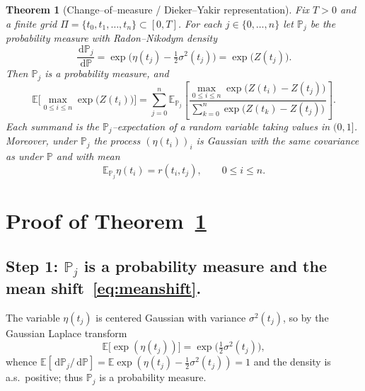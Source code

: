 \documentclass{amsart}
\newtheorem{theorem}{Theorem}
\theoremstyle{definition}
\newcommand{\E}{\mathbb{E}}
\newcommand{\PP}{\mathbb{P}}
\newcommand{\dd}{\,\mathrm{d}}
\begin{document}
\begin{theorem}[Change--of--measure / Dieker--Yakir representation]\label{thm:DY}
Fix $T>0$ and a finite grid $\Pi=\{t_0,t_1,\dots,t_n\}\subset[0,T]$.
For each $j\in\{0,\dots,n\}$ let $\PP_j$ be the probability measure with
Radon--Nikodym density
\begin{equation}\label{eq:tilt}
   \frac{\dd\PP_j}{\dd\PP}
   =\exp\!\big(\eta(t_j)-\tfrac12\sigma^2(t_j)\big)
   =\exp\big(Z(t_j)\big).
\end{equation}
Then $\PP_j$ is a probability measure, and
\begin{equation}\label{eq:DYexact}
   \E\Big[\max_{0\le i\le n}\exp\!\big(Z(t_i)\big)\Big]
   =\sum_{j=0}^{n}\E_{\PP_j}\!\left[
     \frac{\displaystyle\max_{0\le i\le n}\exp\!\big(Z(t_i)-Z(t_j)\big)}
          {\displaystyle\sum_{k=0}^{n}\exp\!\big(Z(t_k)-Z(t_j)\big)}\right].
\end{equation}
Each summand is the $\PP_j$--expectation of a random variable taking values
in $(0,1]$.  Moreover, under $\PP_j$ the process $(\eta(t_i))_{i}$ is Gaussian
with the same covariance as under $\PP$ and with mean
\begin{equation}\label{eq:meanshift}
   \E_{\PP_j}\eta(t_i)=r(t_i,t_j),\qquad 0\le i\le n.
\end{equation}
\end{theorem}

\section{Proof of Theorem~\ref{thm:DY}}

\subsection*{Step 1: $\PP_j$ is a probability measure and the mean shift~\eqref{eq:meanshift}.}
The variable $\eta(t_j)$ is centered Gaussian with variance $\sigma^2(t_j)$, so by
the Gaussian Laplace transform
\[
   \E\big[\exp(\eta(t_j))\big]=\exp\!\big(\tfrac12\sigma^2(t_j)\big),
\]
whence $\E[\dd\PP_j/\dd\PP]=\E\exp(\eta(t_j)-\tfrac12\sigma^2(t_j))=1$ and the
density is a.s.\ positive; thus $\PP_j$ is a probability measure.
\end{document}
